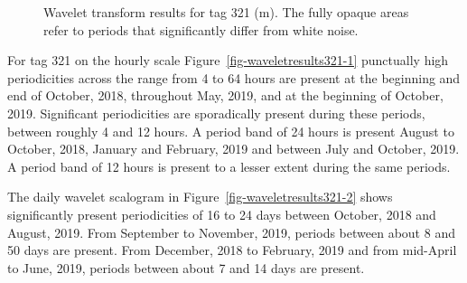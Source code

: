 \documentclass[
  authoryear,
  review,
  3p]{elsarticle}
\begin{document}
\begin{figure}

\begin{minipage}[t]{\linewidth}

{\centering 


}

\end{minipage}%
\newline
\begin{minipage}[t]{\linewidth}

{\centering 


}

\end{minipage}%

\caption{\label{fig-waveletresults321}Wavelet transform results for tag
321 (m). The fully opaque areas refer to periods that significantly
differ from white noise.}

\end{figure}

For tag 321 on the hourly scale Figure~\ref{fig-waveletresults321-1}
punctually high periodicities across the range from 4 to 64 hours are
present at the beginning and end of October, 2018, throughout May, 2019,
and at the beginning of October, 2019. Significant periodicities are
sporadically present during these periods, between roughly 4 and 12
hours. A period band of 24 hours is present August to October, 2018,
January and February, 2019 and between July and October, 2019. A period
band of 12 hours is present to a lesser extent during the same periods.

The daily wavelet scalogram in Figure~\ref{fig-waveletresults321-2}
shows significantly present periodicities of 16 to 24 days between
October, 2018 and August, 2019. From September to November, 2019,
periods between about 8 and 50 days are present. From December, 2018 to
February, 2019 and from mid-April to June, 2019, periods between about 7
and 14 days are present.
\end{document}
